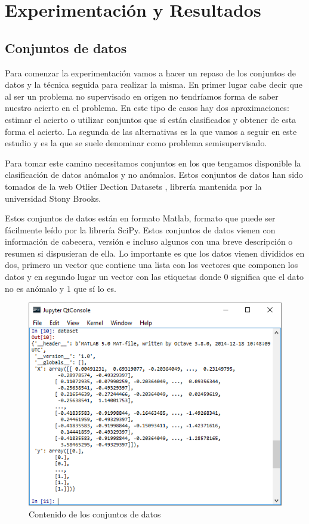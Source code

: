\chapter{Experimentación y Resultados}
\label{chapter:experimentacion_resultados}

\section{Conjuntos de datos}

Para comenzar la experimentación vamos a hacer un repaso de los conjuntos de datos y la técnica seguida para realizar la misma. En primer lugar cabe decir que al ser un problema no supervisado en origen no tendríamos forma de saber nuestro acierto en el problema. En este tipo de casos hay dos aproximaciones: estimar el acierto o utilizar conjuntos que sí están clasificados y obtener de esta forma el acierto. La segunda de las alternativas es la que vamos a seguir en este estudio y es la que se suele denominar como problema semisupervisado. 

Para tomar este camino necesitamos conjuntos en los que tengamos disponible la clasificación de datos anómalos y no anómalos. Estos conjuntos de datos han sido tomados de la web Otlier Dection Datasets \cite{shebuti_ryana_odds_2016}, librería mantenida por la universidad Stony Brooks.

Estos conjuntos de datos están en formato Matlab, formato que puede ser fácilmente leído por la librería SciPy. Estos conjuntos de datos vienen con información de cabecera, versión e incluso algunos con una breve descripción o resumen si dispusieran de ella. Lo importante es que los datos vienen divididos en dos, primero un vector que contiene una lista con los vectores que componen los datos y en segundo lugar un vector con las etiquetas donde $0$ significa que el dato no es anómalo y $1$ que sí lo es.

\begin{figure}[H]
	\centering
	\label{dataset_matlab}
	\includegraphics[scale=0.8]{imagenes/datasets_matlab}
	\caption{Contenido de los conjuntos de datos}
\end{figure}

